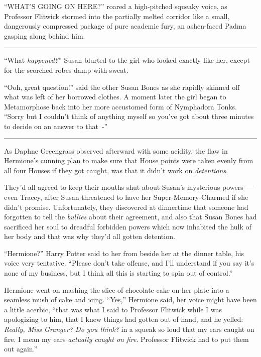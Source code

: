 ``WHAT'S GOING ON HERE?'' roared a high-pitched squeaky voice, as Professor Flitwick stormed into the partially melted corridor like a small, dangerously compressed package of pure academic fury, an ashen-faced Padma gasping along behind him.

\begin{center}\rule{3in}{0.4pt}\end{center}

``What \emph{happened?}'' Susan blurted to the girl who looked exactly like her, except for the scorched robes damp with sweat.

``Ooh, great question!'' said the other Susan Bones as she rapidly skinned off what was left of her borrowed clothes. A moment later the girl began to Metamorphose back into her more accustomed form of Nymphadora Tonks. ``Sorry but I couldn't think of anything myself so you've got about three minutes to decide on an answer to that~-''

\begin{center}\rule{3in}{0.4pt}\end{center}

As Daphne Greengrass observed afterward with some acidity, the flaw in Hermione's cunning plan to make sure that House points were taken evenly from all four Houses if they got caught, was that it didn't work on \emph{detentions}.

They'd all agreed to keep their mouths shut about Susan's mysterious powers~--- even Tracey, after Susan threatened to have her Super-Memory-Charmed if she didn't promise. Unfortunately, they discovered at dinnertime that someone had forgotten to tell the \emph{bullies} about their agreement, and also that Susan Bones had sacrificed her soul to dreadful forbidden powers which now inhabited the hulk of her body and that was why they'd all gotten detention.

``Hermione?'' Harry Potter said to her from beside her at the dinner table, his voice very tentative. ``Please don't take offense, and I'll understand if you say it's none of my business, but I think all this is starting to spin out of control.''

Hermione went on mashing the slice of chocolate cake on her plate into a seamless mush of cake and icing. ``Yes,'' Hermione said, her voice might have been a little acerbic, ``that was what I said to Professor Flitwick while I was apologizing to him, that I knew things had gotten out of hand, and he yelled: \emph{Really, Miss Granger? Do you think?} in a squeak so loud that my ears caught on fire. I mean my ears \emph{actually caught on fire}. Professor Flitwick had to put them out again.''

